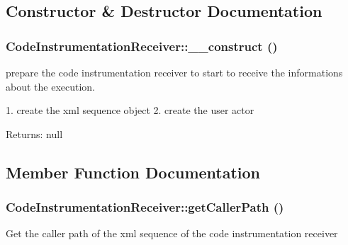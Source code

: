 \subsection{Constructor \& Destructor Documentation}
\hypertarget{class_code_instrumentation_receiver_118198dd8eaf3a12e3bbc407a92a3376}{
\subsubsection[{\_\-\_\-construct}]{\setlength{\rightskip}{0pt plus 5cm}CodeInstrumentationReceiver::\_\-\_\-construct ()}}
\label{class_code_instrumentation_receiver_118198dd8eaf3a12e3bbc407a92a3376}


prepare the code instrumentation receiver to start to receive the informations about the execution.

1. create the xml sequence object 2. create the user actor

\begin{Desc}
\item[Returns:]null \end{Desc}


\subsection{Member Function Documentation}
\hypertarget{class_code_instrumentation_receiver_8e5e85fb7a58ef069788033b05ba0004}{
\subsubsection[{getCallerPath}]{\setlength{\rightskip}{0pt plus 5cm}CodeInstrumentationReceiver::getCallerPath ()}}
\label{class_code_instrumentation_receiver_8e5e85fb7a58ef069788033b05ba0004}


Get the caller path of the xml sequence of the code instrumentation receiver

